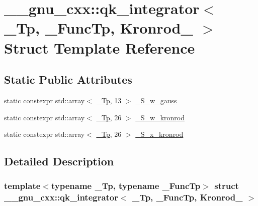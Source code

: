\hypertarget{struct____gnu__cxx_1_1qk__integrator_3_01__Tp_00_01__FuncTp_00_01Kronrod__51_01_4}{}\section{\+\_\+\+\_\+gnu\+\_\+cxx\+:\+:qk\+\_\+integrator$<$ \+\_\+\+Tp, \+\_\+\+Func\+Tp, Kronrod\+\_ $>$ Struct Template Reference}
\label{struct____gnu__cxx_1_1qk__integrator_3_01__Tp_00_01__FuncTp_00_01Kronrod__51_01_4}
\subsection*{Static Public Attributes}
\begin{DoxyCompactItemize}
\item 
static constexpr std\+::array$<$ \hyperlink{namespace____gnu__cxx_a3b19a9c800ca194374ef9172290f7d79}{\+\_\+\+Tp}, 13 $>$ \hyperlink{struct____gnu__cxx_1_1qk__integrator_3_01__Tp_00_01__FuncTp_00_01Kronrod__51_01_4_a46350a2894837e29ffe6b9b3cdf1c0ed}{\+\_\+\+S\+\_\+w\+\_\+gauss}
\item 
static constexpr std\+::array$<$ \hyperlink{namespace____gnu__cxx_a3b19a9c800ca194374ef9172290f7d79}{\+\_\+\+Tp}, 26 $>$ \hyperlink{struct____gnu__cxx_1_1qk__integrator_3_01__Tp_00_01__FuncTp_00_01Kronrod__51_01_4_a8d7e36c2d8170d042fa9304f7a8fe19e}{\+\_\+\+S\+\_\+w\+\_\+kronrod}
\item 
static constexpr std\+::array$<$ \hyperlink{namespace____gnu__cxx_a3b19a9c800ca194374ef9172290f7d79}{\+\_\+\+Tp}, 26 $>$ \hyperlink{struct____gnu__cxx_1_1qk__integrator_3_01__Tp_00_01__FuncTp_00_01Kronrod__51_01_4_ac647589b7c6211e9c089108dc8af8236}{\+\_\+\+S\+\_\+x\+\_\+kronrod}
\end{DoxyCompactItemize}


\subsection{Detailed Description}
\subsubsection*{template$<$typename \+\_\+\+Tp, typename \+\_\+\+Func\+Tp$>$\newline
struct \+\_\+\+\_\+gnu\+\_\+cxx\+::qk\+\_\+integrator$<$ \+\_\+\+Tp, \+\_\+\+Func\+Tp, Kronrod\+\_ $>$}

